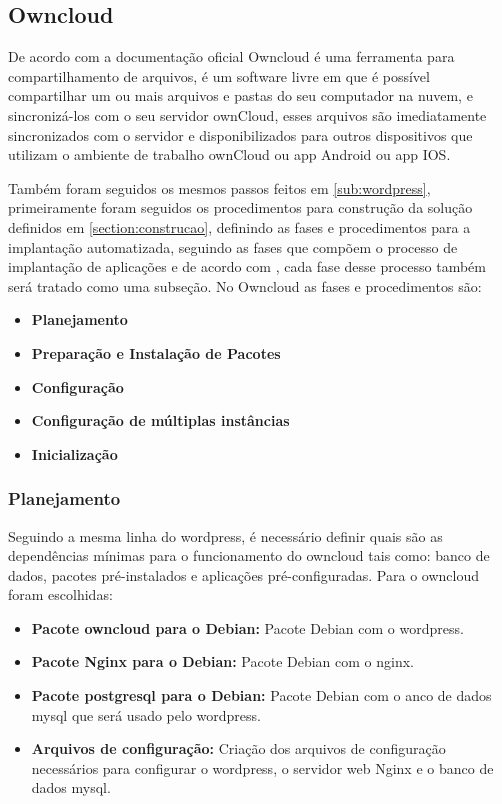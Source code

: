 \subsection{Owncloud}
\label{sub:owncloud}

De acordo com a documentação oficial \cite{owncloud} Owncloud é uma ferramenta
para compartilhamento de arquivos, é um software livre em que é possível compartilhar
um ou mais arquivos e pastas do seu computador na nuvem, e sincronizá-los com o seu
servidor ownCloud, esses arquivos são imediatamente sincronizados com o servidor
e disponibilizados para outros dispositivos que utilizam o ambiente de trabalho
ownCloud ou app Android ou app IOS.

Também foram seguidos os mesmos passos feitos em \ref{sub:wordpress}, primeiramente
foram seguidos os procedimentos para construção da solução definidos em \ref{section:construcao},
definindo as fases e procedimentos para a implantação automatizada, seguindo as
fases que compõem o processo de implantação de aplicações e de acordo com \cite{omg2006},
cada fase desse processo também será tratado como uma subseção. No Owncloud as
fases e procedimentos são:

\begin{itemize}
  \item  \textbf{Planejamento}
  \item  \textbf{Preparação e Instalação de Pacotes}
  \item  \textbf{Configuração}
  \item  \textbf{Configuração de múltiplas instâncias}
  \item  \textbf{Inicialização}
\end{itemize}

\subsubsection{Planejamento}

Seguindo a mesma linha do wordpress, é necessário definir quais são as dependências
mínimas para o funcionamento do owncloud tais como: banco de dados, pacotes
pré-instalados e aplicações pré-configuradas. Para o owncloud foram escolhidas:

\begin{itemize}
   \item \textbf{Pacote owncloud para o Debian:} Pacote Debian com o wordpress.
   \item \textbf{Pacote Nginx para o Debian:} Pacote Debian com o nginx.
   \item \textbf{Pacote postgresql para o Debian:} Pacote Debian com o anco de dados mysql
   que será usado pelo wordpress.
   \item \textbf{Arquivos de configuração:} Criação dos arquivos de configuração
   necessários para configurar o wordpress, o servidor web Nginx e o banco de dados
   mysql.
\end{itemize}

